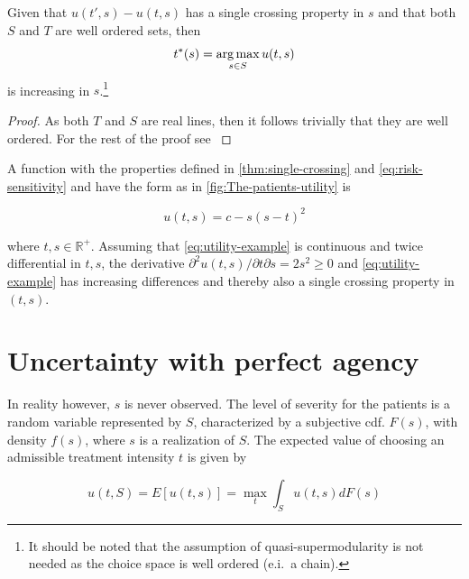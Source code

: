 \documentclass[10pt,a4paper]{article} 					%
\begin{document}
\begin{prop}
Given that $u(t',s)-u(t,s)$ has a single crossing property in $s$ and that both $S$ and $T$ are well ordered sets, then
\[
	t^{*}(s)=\argmax_{s\in S}u(t,s)\label{eq:increasing-solution}
\]
is increasing in $s$.\footnote{It should be noted that the assumption of quasi-supermodularity is not needed as the choice space is well ordered (e.i.\ a chain).}
\end{prop}

\begin{proof}
As both $T$ and $S$ are real lines, then it follows trivially that they are well ordered. For the rest of the proof see \textcite{Milgrom1994}
\end{proof}

\begin{example}
A function with the properties defined in \cref{thm:single-crossing} and \cref{eq:risk-sensitivity} and have the form as in \cref{fig:The-patients-utility} is

\[
	u(t,s) = c-s{(s-t)}^{2}\label{eq:utility-example}
\]

where $t,s\in\mathbb{R}^{+}$. Assuming that \cref{eq:utility-example} is continuous and twice differential in $t,s$, the derivative $\partial^{2}u(t,s)\big/\partial t\partial s=2s^{2}\ge0$ and \cref{eq:utility-example} has increasing differences and thereby also a single crossing property in $(t,s)$.
\end{example}


\section{Uncertainty with perfect agency}

In reality however, $s$ is never observed. The level of severity for the patients is a random variable represented by $S$, characterized by a subjective cdf. $F(s)$, with density $f(s)$, where $s$ is a realization of $S$. The expected value of choosing an admissible treatment intensity $t$ is given by

\[
	u(t,S)=E[u(t,s)]=\max_{t}\int_{S}u(t,s)dF(s)\label{eq:expected-utility-prior}
\]
\end{document}
